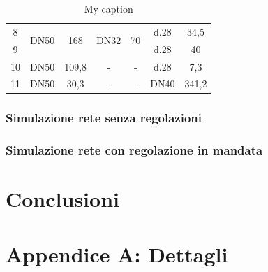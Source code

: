 \documentclass[laurea,oneside,11pt]{USiena_tesiLM}
\begin{document}
\begin{table}[]
\begin{tabular}{|c|c|c|c|c|c|c|}
8                                             & \multirow{2}{*}{DN50} & \multirow{2}{*}{168}                   & \multirow{2}{*}{DN32}     & \multirow{2}{*}{70}   & d.28         & 34,5                      \\ \cline{1-1} \cline{6-7} 
9                                             &                       &                                        &                           &                       & d.28         & 40                        \\ \hline
10                                            & DN50                  & 109,8                                  & -                         & -                     & d.28         & 7,3                       \\ \hline
11                                            & DN50                  & 30,3                                   & -                         & -                     & DN40         & 341,2                     \\ \hline
\end{tabular}
\caption{My caption}
\label{tab:rete_ippolito}
\end{table}


\subsection{Simulazione rete senza regolazioni}

\subsection{Simulazione rete con regolazione in mandata}



\chapter{Conclusioni}


\backmatter

\appendix
\chapter{Appendice A: Dettagli}
%


%



%

\end{document}
